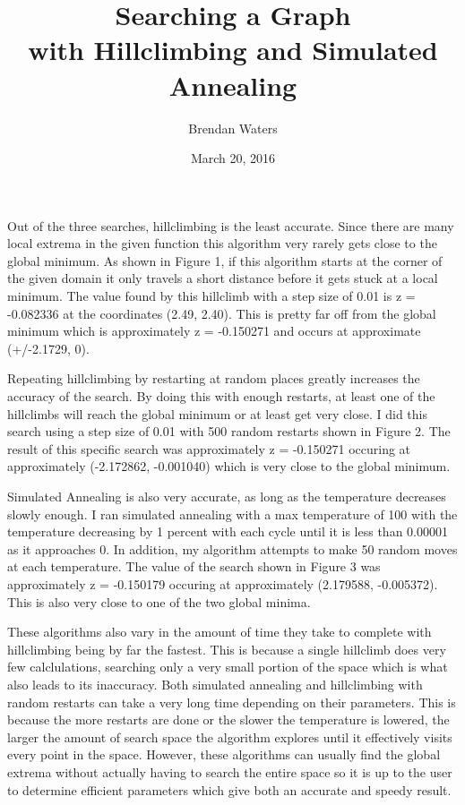 \documentclass{article}
\title{%
  Searching a Graph \\
  \large with Hillclimbing and Simulated Annealing}
\author{Brendan Waters}
\date{March 20, 2016}
\begin{document}
  \maketitle
  Out of the three searches, hillclimbing is the least accurate. Since there are many local extrema in the given function this algorithm very rarely gets close to the global minimum. As shown in Figure 1, if this algorithm starts at the corner of the given domain it only travels a short distance before it gets stuck at a local minimum. The value found by this hillclimb with a step size of 0.01 is z = -0.082336 at the coordinates (2.49, 2.40). This is pretty far off from the global minimum which is approximately z = -0.150271 and occurs at approximate (+/-2.1729, 0).
  \par
  Repeating hillclimbing by restarting at random places greatly increases the accuracy of the search. By doing this with enough restarts, at least one of the hillclimbs will reach the global minimum or at least get very close. I did this search using a step size of 0.01 with 500 random restarts shown in Figure 2. The result of this specific search was approximately z = -0.150271 occuring at approximately (-2.172862, -0.001040) which is very close to the global minimum.
  \par
  Simulated Annealing is also very accurate, as long as the temperature decreases slowly enough. I ran simulated annealing with a max temperature of 100 with the temperature decreasing by 1 percent with each cycle until it is less than 0.00001 as it approaches 0. In addition, my algorithm attempts to make 50 random moves at each temperature. The value of the search shown in Figure 3 was approximately z = -0.150179 occuring at approximately (2.179588, -0.005372). This is also very close to one of the two global minima.
  \par
  These algorithms also vary in the amount of time they take to complete with hillclimbing being by far the fastest. This is because a single hillclimb does very few calclulations, searching only a very small portion of the space which is what also leads to its inaccuracy. Both simulated annealing and hillclimbing with random restarts can take a very long time depending on their parameters. This is because the more restarts are done or the slower the temperature is lowered, the larger the amount of search space the algorithm explores until it effectively visits every point in the space. However, these algorithms can usually find the global extrema without actually having to search the entire space so it is up to the user to determine efficient parameters which give both an accurate and speedy result.
\end{document}
